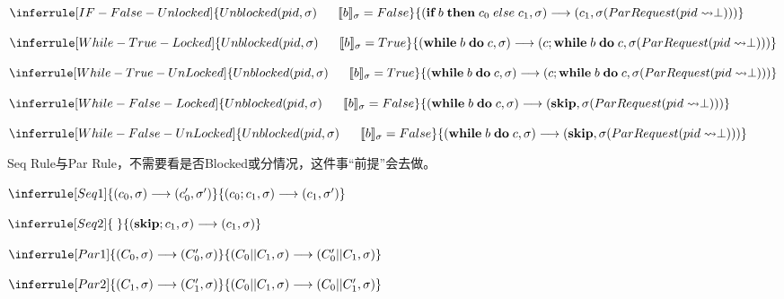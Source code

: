 \documentclass[UTF8, 8pt, a4paper ]{ctexart}
\begin{document}
\begin{small}
\begin{center}
		
		\kspace
		
		$
		\inferrule[IF-False-Unlocked]  %
		{ Unblocked(pid, \sigma)\;\;\;\;\;\;\llbracket b \rrbracket_{\sigma} = False}
		{ (\textbf{if}\;b\;\textbf{then}\;c_0\;else\;c_1, \sigma)\longrightarrow (c_1, \sigma(ParRequest(pid\rightsquigarrow \perp)))}
		$
		\kspace
		
		$
		\inferrule[While-True-Locked]
		{ Unblocked(pid, \sigma)\;\;\;\;\;\;\llbracket b \rrbracket_{\sigma} = True}
		{(\textbf{while}\;b\;\textbf{do}\;c, \sigma)\longrightarrow(c;\textbf{while}\;b\;\textbf{do}\;c, \sigma(ParRequest(pid\rightsquigarrow \perp)))}
		$

		\kspace
		$
		\inferrule[While-True-UnLocked]
		{ Unblocked(pid, \sigma)\;\;\;\;\;\;\llbracket b \rrbracket_{\sigma} = True}
		{(\textbf{while}\;b\;\textbf{do}\;c, \sigma)\longrightarrow(c;\textbf{while}\;b\;\textbf{do}\;c, \sigma(ParRequest(pid\rightsquigarrow \perp)))}
		$

		\kspace
		$
		\inferrule[While-False-Locked]
		{ Unblocked(pid, \sigma)\;\;\;\;\;\;\llbracket b \rrbracket_{\sigma} = False}
		{(\textbf{while}\;b\;\textbf{do}\;c, \sigma)\longrightarrow(\textbf{skip}, \sigma(ParRequest(pid\rightsquigarrow \perp)))}
		$
		
		\kspace
		$
		\inferrule[While-False-UnLocked]
		{ Unblocked(pid, \sigma)\;\;\;\;\;\;\llbracket b \rrbracket_{\sigma} = False}
		{(\textbf{while}\;b\;\textbf{do}\;c, \sigma)\longrightarrow(\textbf{skip}, \sigma(ParRequest(pid\rightsquigarrow \perp)))}
		$

		\kspace
		Seq Rule与Par Rule，不需要看是否Blocked或分情况，这件事“前提”会去做。

		$
		\inferrule[Seq1]
		{ (c_0, \sigma) \longrightarrow (c_0', \sigma') }
		{ (c_0;c_1, \sigma) \longrightarrow (c_1, \sigma') }
		$
		
		\kspace

		$
		\inferrule[Seq2]
		{\;}
		{ (\textbf{skip};c_1, \sigma) \longrightarrow (c_1, \sigma) }
		$

		\kspace
		$
		\inferrule[Par1]  %
		{ (C_0, \sigma) \longrightarrow (C_0', \sigma)}
		{ (C_0 || C_1, \sigma) \longrightarrow (C_0' || C_1, \sigma)}
		$
		\kspace

		$
		\inferrule[Par2]  %
		{ (C_1, \sigma) \longrightarrow (C_1', \sigma)}
		{ (C_0 || C_1, \sigma) \longrightarrow (C_0 || C_1', \sigma)}
		$


\end{center}
\end{small}
\end{document}
